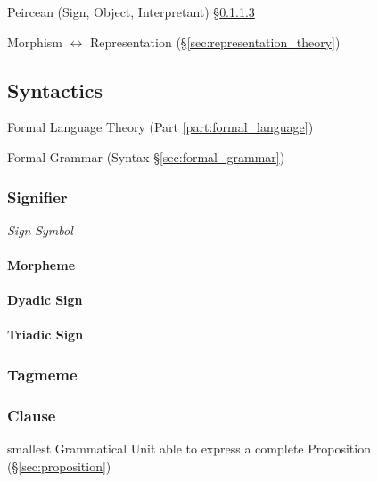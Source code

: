 Peircean (Sign, Object, Interpretant) \S\ref{sec:triadic_sign}

Morphism $\leftrightarrow$ Representation
(\S\ref{sec:representation_theory})



\subsection{Syntactics}\label{sec:syntactics}

Formal Language Theory (Part \ref{part:formal_language})

Formal Grammar (Syntax \S\ref{sec:formal_grammar})



\subsubsection{Signifier}\label{sec:signifier}

\emph{Sign} \emph{Symbol}



\paragraph{Morpheme}\label{sec:morpheme}\hfill

\paragraph{Dyadic Sign}\label{sec:dyadic_sign}\hfill

\paragraph{Triadic Sign}\label{sec:triadic_sign}\hfill



\subsubsection{Tagmeme}\label{sec:tagmeme}

\subsubsection{Clause}\label{sec:grammatical_clause}

smallest Grammatical Unit able to express a complete Proposition
(\S\ref{sec:proposition})

